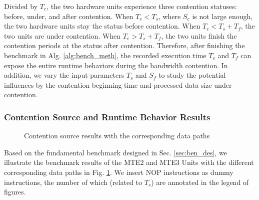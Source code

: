 \documentclass[12pt]{extbook}
\begin{document}
Divided by $T_{e}$, the two hardware units experience three contention statuses: before, under, and after contention. When $T_{e} < T_{s}$, where $S_{e}$ is not large enough, the two hardware units stay the status before contention. When $T_{e} < T_{s} + T_{f}$, the two units are under contention. When $T_{e} > T_{s} + T_{f}$, the two units finish the contention periods at the status after contention. Therefore, after finishing the benchmark in Alg. \ref{alg:bench_meth}, the recorded execution time $T_{e}$ and $T_{f}$ can expose the entire runtime behaviors during the bandwidth contention. In addition, we vary the input parameters $T_{s}$ and $S_{f}$ to study the potential influences by the contention beginning time and processed data size under contention.

\subsubsection{Contention Source and Runtime Behavior Results \label{sec:runtime}}

\begin{figure}[t]
    \caption{Contention source results with the corresponding data paths}
    \label{fig:cont_source}
    \end{figure}

Based on the fundamental benchmark designed in Sec. \ref{sec:ben_des}, we illustrate the benchmark results of the MTE2 and MTE3 Units with the different corresponding data paths in Fig. \ref{fig:cont_source}. We insert NOP instructions as dummy instructions, the number of which (related to $T_s$) are annotated in the legend of figures.
\end{document}
